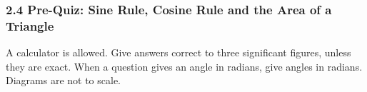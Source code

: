 \documentclass[12pt, twoside]{article}
\begin{document}
\subsubsection*{2.4 Pre-Quiz: Sine Rule, Cosine Rule and the Area of a Triangle}

\begin{center}
\end{center}

A calculator is allowed. Give answers correct to three significant figures,
unless they are exact. When a question gives an angle in radians, give
angles in radians. Diagrams are not to scale.
\end{document}
